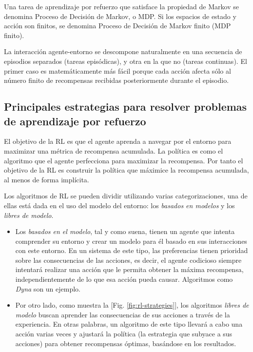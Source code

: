 Una tarea de aprendizaje por refuerzo que satisface la propiedad de Markov se denomina Proceso de Decisión de Markov, o MDP. Si los espacios de estado y acción son finitos, se denomina Proceso de Decisión de Markov finito (MDP finito).

La interacción agente-entorno se descompone naturalmente en una secuencia de episodios separados (tareas episódicas), y otra en la que no (tareas continuas). El primer caso es matemáticamente más fácil porque cada acción afecta sólo al número finito de recompensas recibidas posteriormente durante el episodio.

\subsection{Principales estrategias para resolver problemas de aprendizaje por refuerzo}

El objetivo de la RL es que el agente aprenda a navegar por el entorno para maximizar una métrica de recompensa acumulada. La política es como el algoritmo que el agente perfecciona para maximizar la recompensa. Por tanto el objetivo de la RL es construir la política que máximice la recompensa acumulada, al menos de forma implícita.

Los algoritmos de RL se pueden dividir utilizando varias categorizaciones, una de ellas está dada en el uso del modelo del entorno: los \textit{basados en modelos} y los \textit{libres de modelo}.

\begin{itemize}
\item Los \textit{basados en el modelo}, tal y como suena, tienen un agente que intenta comprender su entorno y crear un modelo para él basado en sus interacciones con este entorno. En un sistema de este tipo, las preferencias tienen prioridad sobre las consecuencias de las acciones, es decir, el agente codicioso siempre intentará realizar una acción que le permita obtener la máxima recompensa, independientemente de lo que esa acción pueda causar. Algoritmos como \textit{Dyna} son un ejemplo.

\item Por otro lado, como muestra la [Fig. \ref{fig:rl-strategies}], los algoritmos \textit{libres de modelo} buscan aprender las consecuencias de sus acciones a través de la experiencia. En otras palabras, un algoritmo de este tipo llevará a cabo una acción varias veces y ajustará la política (la estrategia que subyace a sus acciones) para obtener recompensas óptimas, basándose en los resultados.
\end{itemize}

